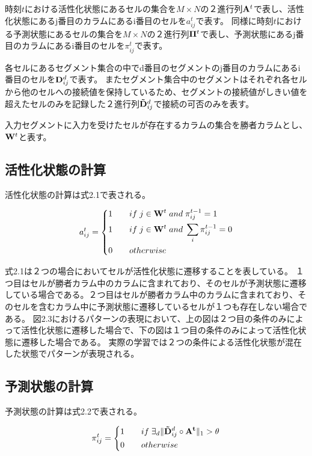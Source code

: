 時刻$t$における活性化状態にあるセルの集合を$M \times N$の２進行列${\bf A}^t$で表し、活性化状態にあるj番目のカラムにあるi番目のセルを$a^t_{ij}$で表す。
同様に時刻$t$における予測状態にあるセルの集合を$M \times N$の２進行列${\bf \Pi}^t$で表し、予測状態にあるj番目のカラムにあるi番目のセルを$\pi^t_{ij}$で表す。

各セルにあるセグメント集合の中でd番目のセグメントのj番目のカラムにあるi番目のセルを${\bf D}^d_{ij}$で表す。
またセグメント集合中のセグメントはそれぞれ各セルから他のセルへの接続値を保持しているため、セグメントの接続値がしきい値を超えたセルのみを記録した２進行列${\bf \tilde{D}}^d_{ij}$で接続の可否のみを表す。

入力セグメントに入力を受けたセルが存在するカラムの集合を勝者カラムとし、${\bf W}^t$と表す。

\subsection{活性化状態の計算}
活性化状態の計算は式2.1で表される。

\begin{equation}
  a^t_{ij} =
  \left\{
  \begin{alignedat}{3}
    1 \qquad &if \; j\in{\bf W}^t \; and \; \pi^{t-1}_{ij} = 1\\
    1 \qquad &if \; j\in{\bf W}^t \; and \; \sum_i \pi^{t-1}_{ij} = 0\\
    0 \qquad &otherwise
  \end{alignedat}
  \right.
\end{equation}

式2.1は２つの場合においてセルが活性化状態に遷移することを表している。
１つ目はセルが勝者カラム中のカラムに含まれており、そのセルが予測状態に遷移している場合である。２つ目はセルが勝者カラム中のカラムに含まれており、そのセルを含むカラム中に予測状態に遷移しているセルが１つも存在しない場合である。
図2.3におけるパターンの表現において、上の図は２つ目の条件のみによって活性化状態に遷移した場合で、下の図は１つ目の条件のみによって活性化状態に遷移した場合である。
実際の学習では２つの条件による活性化状態が混在した状態でパターンが表現される。

\subsection{予測状態の計算}
予測状態の計算は式2.2で表される。

\begin{equation}
  \pi^t_{ij} =
  \left\{
  \begin{alignedat}{2}
    1 \qquad &if \; \exists_d\|{\bf \tilde{D}}^d_{ij} \circ {\bf A^t}\|_1 > \theta\\
    0 \qquad &otherwise
  \end{alignedat}
  \right.
\end{equation}


